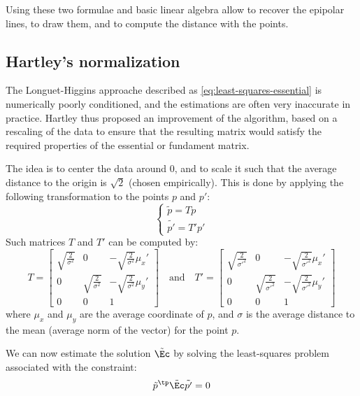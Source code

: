Using these two formulae and basic linear algebra allow to recover the epipolar lines, to draw them, and to compute the distance with the points.

\subsection{Hartley's normalization}
The Longuet-Higgins approache described as \autoref{eq:least-squares-essential} is numerically poorly conditioned, and the estimations are often very inaccurate in practice. Hartley thus proposed an improvement of the algorithm, based on a rescaling of the data to ensure that the resulting matrix would satisfy the required properties of the essential or fundament matrix.

The idea is to center the data around 0, and to scale it such that the average distance to the origin is $\sqrt{2}$ (chosen empirically). This is done by applying the following transformation to the points $p$ and $p'$:
\begin{equation*}
    \begin{cases}
        \tilde{p} = Tp\\
        \tilde{p'} = T'p'
    \end{cases}
\end{equation*}
Such matrices $T$ and $T'$ can be computed by:
\begin{equation*}
    T = \begin{bmatrix}
        \sqrt{\frac{2}{\sigma^2}} & 0 & -\sqrt{\frac{2}{\sigma^2}}\mu_x' \\
        0 & \sqrt{\frac{2}{\sigma^2}} & -\sqrt{\frac{2}{\sigma^2}}\mu_y' \\
        0 & 0 & 1
    \end{bmatrix}
    \quad\text{and}\quad
    T' = \begin{bmatrix}
        \sqrt{\frac{2}{\sigma'^2}} & 0 & -\sqrt{\frac{2}{\sigma'^2}}\mu_x' \\
        0 & \sqrt{\frac{2}{\sigma'^2}} & -\sqrt{\frac{2}{\sigma'^2}}\mu_y' \\
        0 & 0 & 1
    \end{bmatrix}
\end{equation*}
where $\mu_x$ and $\mu_y$ are the average coordinate of $p$, and $\sigma$ is the average distance to the mean (average norm of the vector) for the point $p$.

We can now estimate the solution $\tilde{\Ec}$ by solving the least-squares problem associated with the constraint:
\begin{equation}
    \label{eq:normalized-essential}
    \tilde{p}^\tp\tilde{\Ec}\tilde{p'}=0
\end{equation}

